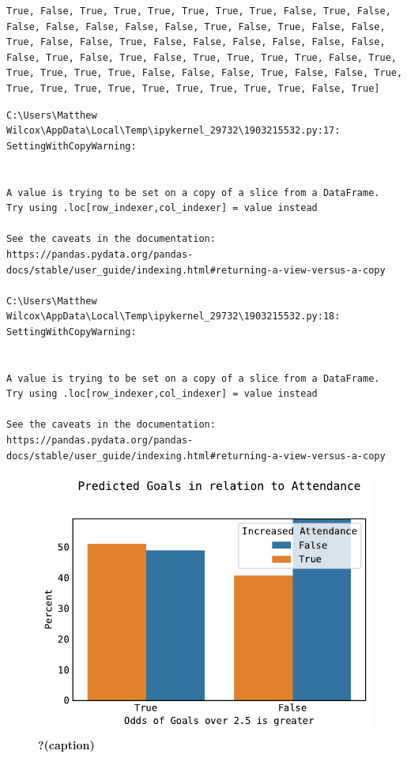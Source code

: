 \documentclass[
  letterpaper,
  DIV=11,
  numbers=noendperiod]{scrartcl}
\begin{document}
\begin{verbatim}
True, False, True, True, True, True, True, True, False, True, False, False, False, False, False, False, True, False, True, False, False, True, False, False, True, False, False, False, False, False, False, False, True, False, True, False, True, True, True, True, False, True, True, True, True, True, False, False, False, True, False, False, True, True, True, True, True, True, True, True, True, True, False, True]
\end{verbatim}

\begin{verbatim}
C:\Users\Matthew Wilcox\AppData\Local\Temp\ipykernel_29732\1903215532.py:17: SettingWithCopyWarning:


A value is trying to be set on a copy of a slice from a DataFrame.
Try using .loc[row_indexer,col_indexer] = value instead

See the caveats in the documentation: https://pandas.pydata.org/pandas-docs/stable/user_guide/indexing.html#returning-a-view-versus-a-copy

C:\Users\Matthew Wilcox\AppData\Local\Temp\ipykernel_29732\1903215532.py:18: SettingWithCopyWarning:


A value is trying to be set on a copy of a slice from a DataFrame.
Try using .loc[row_indexer,col_indexer] = value instead

See the caveats in the documentation: https://pandas.pydata.org/pandas-docs/stable/user_guide/indexing.html#returning-a-view-versus-a-copy
\end{verbatim}

\begin{figure}[H]

{\centering \includegraphics{Blog_post_files/figure-pdf/fig-goals-output-3.pdf}

}

\caption{\label{fig-goals}\textbf{?(caption)}}

\end{figure}
\end{document}
